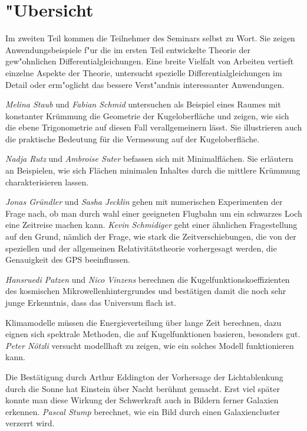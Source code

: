 %
%
%
\chapter*{"Ubersicht}
\rhead{}
\label{skript:uebersicht}
Im zweiten Teil kommen die Teilnehmer des Seminars selbst zu Wort.
Sie zeigen Anwendungsbeispiele f"ur die im ersten
Teil entwickelte Theorie der gew"ohnlichen Differentialgleichungen.
Eine breite Vielfalt von Arbeiten vertieft einzelne Aspekte der Theorie,
untersucht spezielle Differentialgleichungen im Detail
oder erm"oglicht das bessere Verst"andnis interessanter Anwendungen.

{\em Melina Staub} und {\em Fabian Schmid} untersuchen als Beispiel
eines Raumes mit konstanter Krümmung die Geometrie der Kugeloberfläche
und zeigen, wie sich die ebene Trigonometrie auf diesen Fall verallgemeinern
lässt.
Sie illustrieren auch die praktische Bedeutung für die Vermessung auf
der Kugeloberfläche.

{\em Nadja Rutz} und {\em Ambroise Suter} befassen sich mit Minimalflächen.
Sie erläutern an Beispielen, wie sich Flächen minimalen Inhaltes durch
die mittlere Krümmung charakterisieren lassen.

{\em Jonas Gründler} und {\em Sasha Jecklin} gehen mit numerischen
Experimenten der Frage nach, ob man durch wahl einer geeigneten
Flugbahn um ein schwarzes Loch eine Zeitreise machen kann.
{\em Kevin Schmidiger} geht einer ähnlichen Fragestellung auf den Grund,
nämlich der Frage, wie stark die Zeitverschiebungen, die von der
speziellen und der allgemeinen Relativitätstheorie vorhergesagt werden,
die Genauigkeit des GPS beeinflussen.

{\em Hansruedi Patzen} und {\em Nico Vinzens} berechnen
die Kugelfunktionskoeffizienten des kosmischen Mikrowellenhintergrundes
und bestätigen damit die noch sehr junge Erkenntnis, dass das
Universum flach ist.

Klimamodelle müssen die Energieverteilung über lange Zeit berechnen,
dazu eignen sich spektrale Methoden, die auf Kugelfunktionen basieren,
besonders gut. {\em Peter Nötzli} versucht modellhaft zu zeigen, wie
ein solches Modell funktionieren kann.

Die Bestätigung durch Arthur Eddington der Vorhersage der Lichtablenkung
durch die Sonne hat Einstein über Nacht berühmt gemacht.
Erst viel später konnte man diese Wirkung der Schwerkraft auch in
Bildern ferner Galaxien erkennen.
{\em Pascal Stump} berechnet, wie ein Bild durch einen Galaxiencluster
verzerrt wird.

